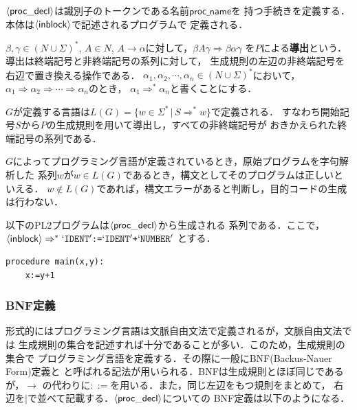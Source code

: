 \documentclass[dvipdfmx,a4j]{jbook}
\begin{document}
$\langle{\mathsf{proc\_decl}}\rangle$は識別子のトークンである名前$\mathsf{proc\_name}$を
持つ手続きを定義する．本体は$\langle{\mathsf{inblock}}\rangle$で記述されるプログラムで
定義される．

$\beta,\gamma\in(N\cup\Sigma)^\ast$,
$A\in N$, $A\rightarrow\alpha$に対して，$\beta A\gamma\Rightarrow \beta\alpha\gamma$
を$P$による{\bf 導出}という．導出は終端記号と非終端記号の系列に対して，
生成規則の左辺の非終端記号を右辺で置き換える操作である．
$\alpha_1,\alpha_2,\cdots,\alpha_n\in (N\cup\Sigma)^\ast$において，
$\alpha_1\Rightarrow\alpha_2\Rightarrow\cdots\Rightarrow\alpha_n$のとき，
$\alpha_1\Rightarrow^\ast\alpha_n$と書くことにする．

$G$が定義する言語は$L(G)=\{w\in\Sigma^\ast\,|\,S\Rightarrow^\ast w\}$で定義される．
すなわち開始記号$S$から$P$の生成規則を用いて導出し，すべての非終端記号が
おきかえられた終端記号の系列である．

$G$によってプログラミング言語が定義されているとき，原始プログラムを字句解析した
系列$w$が$w\in L(G)$であるとき，構文としてそのプログラムは正しいといえる．
$w\notin L(G)$であれば，構文エラーがあると判断し，目的コードの生成は行わない．

\begin{Exmp}\label{DerivEx1}
以下のPL2プログラムは$\langle{\mathsf{proc\_decl}}\rangle$から生成される
系列である．ここで，$\langle{\mathsf{inblock}}\rangle\Rightarrow^\ast
`\texttt{IDENT}' \texttt{:=} `\texttt{IDENT}' \texttt{+} `\texttt{NUMBER}'$
とする．
\begin{Verbatim}[frame=single]
  procedure main(x,y):
    x:=y+1
\end{Verbatim}
\end{Exmp}

\subsubsection{BNF定義}

形式的にはプログラミング言語は文脈自由文法で定義されるが，文脈自由文法では
生成規則の集合を記述すれば十分であることが多い．このため，生成規則の集合で
プログラミング言語を定義する．その際に一般にBNF(Backus-Nauer Form)定義と
と呼ばれる記法が用いられる．BNFは生成規則とほぼ同じであるが，$\rightarrow$
の代わりに$\mathtt{::=}$を用いる．また，同じ左辺をもつ規則をまとめて，
右辺を$\texttt{|}$で並べて記載する．$\langle{\mathsf{proc\_decl}}\rangle$についての
BNF定義は以下のようになる．
\end{document}
